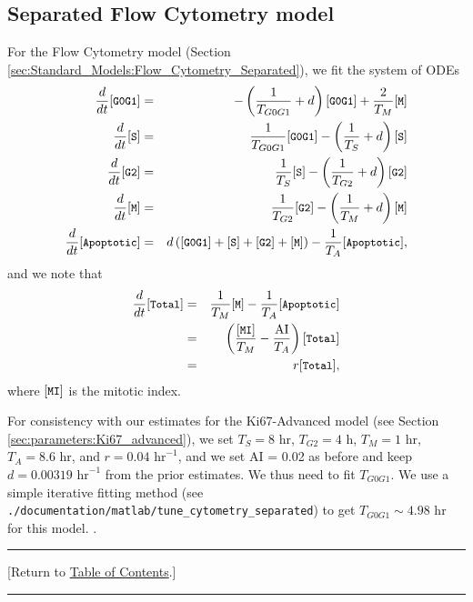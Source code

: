 \documentclass[12pt]{article}
\newcommand{\beqa}{\begin{eqnarray}}
\newcommand{\eeqa}{\end{eqnarray}}
\renewcommand{\v}{\verb}
\renewcommand{\tt}[1]{{\small \left[\texttt{#1}\right] }}
\newcommand{\TOClink}{\begin{center}\hrule\vskip-10pt\phantom{.}\hfill[Return to \hyperlink{TOC}{Table of Contents}.]\hfill\phantom{.}\vskip3pt\hrule\end{center}}
\begin{document}
\subsection{Separated Flow Cytometry model}
\label{sec:parameters:flow_cytometry_separated}
For the Flow Cytometry model (Section \ref{sec:Standard_Models:Flow_Cytometry_Separated}), 
we fit the system of ODEs 
\beqa
\frac{d}{dt}\tt{G0G1} & = & -\left( \frac{1}{T_{G0G1}} + d \right) \tt{G0G1} + \frac{2}{T_{M}}\tt{M}  \\
\frac{d}{dt}\tt{S} & = & \frac{1}{T_{G0G1}} \tt{G0G1} - \left( \frac{1}{T_{S}} + d \right) \tt{S} \\
\frac{d}{dt}\tt{G2} & = &  \frac{1}{T_{S}} \tt{S} - \left( \frac{1}{T_{G2}} + d \right) \tt{G2} \\
\frac{d}{dt}\tt{M} & = &  \frac{1}{T_{G2}} \tt{G2} - \left( \frac{1}{T_{M}} + d \right) \tt{M} \\
\frac{d}{dt}\tt{Apoptotic} & = & d\left( \tt{G0G1} + \tt{S} + \tt{G2} + \tt{M} \right) -\frac{1}{T_A} \tt{Apoptotic}, 
\eeqa
and we note that 
\beqa
\frac{d}{dt}\tt{Total} 
& = & \frac{1}{T_{M}} \tt{M} - \frac{1}{T_A} \tt{Apoptotic} \nonumber \\ 
& = & \left( \frac{\tt{MI}}{T_{M}}  - \frac{\textrm{AI}}{T_A} \right) \tt{Total} \nonumber \\ 
& = & r \tt{Total},
\eeqa
where $\tt{MI}$ is the mitotic index. 

For consistency with our estimates for the Ki67-Advanced model (see Section \ref{sec:parameters:Ki67_advanced}), 
we set $T_{S} = 8$ hr, $T_{G2} = 4$ h, $T_{M} = 1$ hr, $T_A = 8.6$ hr, and 
$r = 0.04 \textrm{ hr}^{-1}$, and we set AI = 0.02 as before and keep 
$d = 0.00319 \textrm{ hr}^{-1}$ from the prior estimates. We thus need to fit  
$T_{G0G1}$. We use a simple iterative fitting method 
(see \v|./documentation/matlab/tune_cytometry_separated|) to get $T_{G0G1} \sim 4.98 \textrm{ hr}$ for this model. 
\cite{ref:Ki67_MCF10A}. 

\TOClink 




\end{document}
